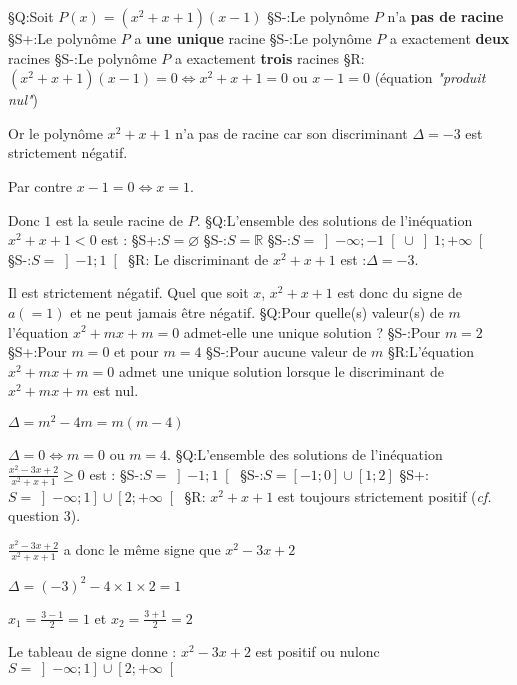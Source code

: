 §Q:Soit $P\left(x\right)=\left(x^{2}+x+1\right)\left(x-1\right)$
§S-:Le polynôme $P$ n'a \textbf{pas de racine}
§S+:Le polynôme $P$ a \textbf{une unique} racine
§S-:Le polynôme $P$ a exactement \textbf{deux} racines
§S-:Le polynôme $P$ a exactement \textbf{trois} racines
§R: $\left(x^{2}+x+1\right)\left(x-1\right)=0  \Leftrightarrow   x^{2}+x+1 = 0 $ ou $x-1=0$ (équation \textit{"produit nul"})
\par
Or le polynôme $x^{2}+x+1$ n'a pas de racine car son discriminant $\Delta  = -3$ est strictement négatif.
\par
Par contre $x-1=0 \Leftrightarrow  x=1$.
\par
Donc $1$ est la seule racine de $P$.
§Q:L'ensemble des solutions de l'inéquation $x^{2}+x+1 < 0$ est :
§S+:$S=\varnothing$
§S-:$S=\mathbb{R}$
§S-:$S=\left]-\infty  ; -1\right[ \cup  \left]1 ; +\infty \right[$
§S-:$S=\left]-1 ; 1\right[$
§R:  Le discriminant de $x^{2}+x+1$ est :$\Delta  = -3$.
\par
Il est strictement négatif. Quel que soit $x$, $x^{2}+x+1$ est donc du signe de $a \left(=1\right)$ et ne peut jamais être négatif.
§Q:Pour quelle(s) valeur(s) de $m$ l'équation $x^{2}+mx+m=0$ admet-elle une unique solution ?
§S-:Pour $m=2$
§S+:Pour $m=0$ et pour $m=4$
§S-:Pour aucune valeur de $m$
§R:L'équation $x^{2}+mx+m=0$ admet une unique solution  lorsque le discriminant de $x^{2}+mx+m$ est nul.
\par
$\Delta  = m^{2} - 4m = m\left(m-4\right)$
\par
$\Delta  = 0  \Leftrightarrow  m=0 $ ou $ m=4$.
§Q:L'ensemble des solutions de l'inéquation $\frac{x^{2}-3x+2}{x^{2}+x+1} \geqslant  0$ est :
§S-:$S=\left]-1 ; 1\right[$
§S-:$S=\left[-1 ; 0\right] \cup  \left[1 ; 2\right]$
§S+:$S=\left]-\infty  ; 1\right] \cup  \left[2 ; +\infty \right[$
§R: $x^{2}+x+1$ est toujours strictement positif (\textit{cf.} question 3).
\par
$\frac{x^{2}-3x+2}{x^{2}+x+1}$ a donc le même signe que $x^{2}-3x+2$
\par
$\Delta  = \left(-3\right)^{2}-4\times 1\times 2=1$
\par
$x_{1}=\frac{3-1}{2}=1$ et $x_{2}=\frac{3+1}{2}=2$
\par
Le tableau de signe donne :
$x^{2}-3x+2$ est positif ou nulonc $S=\left]-\infty  ; 1\right] \cup  \left[2 ; +\infty \right[$
